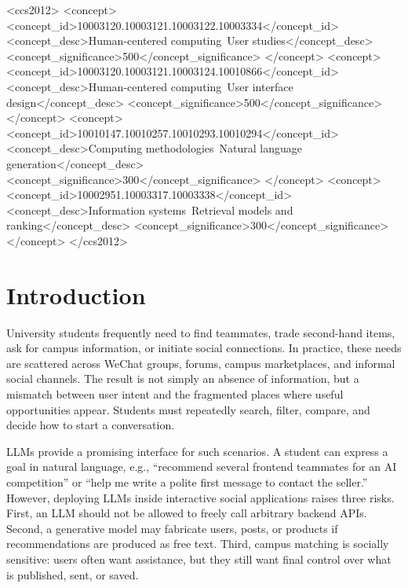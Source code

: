 \documentclass[sigconf]{acmart}
\begin{document}
\begin{CCSXML}
<ccs2012>
 <concept>
  <concept_id>10003120.10003121.10003122.10003334</concept_id>
  <concept_desc>Human-centered computing~User studies</concept_desc>
  <concept_significance>500</concept_significance>
 </concept>
 <concept>
  <concept_id>10003120.10003121.10003124.10010866</concept_id>
  <concept_desc>Human-centered computing~User interface design</concept_desc>
  <concept_significance>500</concept_significance>
 </concept>
 <concept>
  <concept_id>10010147.10010257.10010293.10010294</concept_id>
  <concept_desc>Computing methodologies~Natural language generation</concept_desc>
  <concept_significance>300</concept_significance>
 </concept>
 <concept>
  <concept_id>10002951.10003317.10003338</concept_id>
  <concept_desc>Information systems~Retrieval models and ranking</concept_desc>
  <concept_significance>300</concept_significance>
 </concept>
</ccs2012>
\end{CCSXML}



\maketitle

\section{Introduction}
University students frequently need to find teammates, trade second-hand items, ask for campus information, or initiate social connections. In practice, these needs are scattered across WeChat groups, forums, campus marketplaces, and informal social channels. The result is not simply an absence of information, but a mismatch between user intent and the fragmented places where useful opportunities appear. Students must repeatedly search, filter, compare, and decide how to start a conversation.

LLMs provide a promising interface for such scenarios. A student can express a goal in natural language, e.g., ``recommend several frontend teammates for an AI competition'' or ``help me write a polite first message to contact the seller.'' However, deploying LLMs inside interactive social applications raises three risks. First, an LLM should not be allowed to freely call arbitrary backend APIs. Second, a generative model may fabricate users, posts, or products if recommendations are produced as free text. Third, campus matching is socially sensitive: users often want assistance, but they still want final control over what is published, sent, or saved.
\end{document}
